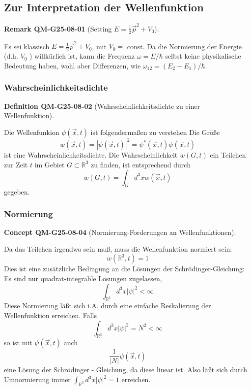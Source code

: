 \documentclass[10pt, letterpaper]{article}
\newcommand{\CustomHeading}[3]{%
  \par\medskip\noindent%
  \textbf{#1 #2} \textnormal{(#3)}.\enskip%
}
\newenvironment{DEF}[2]{\begin{unitbox}\CustomHeading{Definition}{#1}{#2}}{\end{unitbox}}
\newenvironment{REM}[2]{\begin{unitbox}\CustomHeading{Remark}{#1}{#2}}{\end{unitbox}}
\newenvironment{CONC}[2]{\begin{unitbox}\CustomHeading{Concept}{#1}{#2}}{\end{unitbox}}
\begin{document}
\pagebreak



\subsection{Zur Interpretation der Wellenfunktion}



\begin{REM}{QM-G25-08-01}{Setting $E=\frac{1}{2} \vec{p}^{2}+V_{0}$}
Es sei klassisch $E=\frac{1}{2} \vec{p}^{2}+V_{0}$, mit $V_{0}=$ const. Da die Normierung der Energie (d.h. $V_{0}$ ) willkürlich ist, kann die Frequenz $\omega=E / \hbar$ selbst keine physikalische Bedeutung haben, wohl aber Differenzen, wie $\omega_{12}=\left(E_{2}-E_{1}\right) / \hbar$.
\end{REM}


\subsubsection*{Wahrscheinlichkeitsdichte}


\begin{DEF}{QM-G25-08-02}{Wahrscheinlichkeitsdichte zu einer Wellenfunktion}
Die Wellenfunkion $\psi(\vec{x}, t)$ ist folgendermaßen zu verstehen
Die Größe
$$
w(\vec{x}, t)=|\psi(\vec{x}, t)|^{2}=\psi^{*}(\vec{x}, t) \psi(\vec{x}, t)
$$
ist eine Wahrscheinlichkeitsdichte. Die Wahrscheinlichkeit $w(G, t)$ ein Teilchen zur Zeit $t$ im Gebiet $G \subset \mathbb{R}^{3}$ zu finden, ist entsprechend durch
$$
w(G, t)=\int_{G} d^{3} x w(\vec{x}, t)
$$
gegeben.
\end{DEF}

\subsubsection*{Normierung}


\begin{CONC}{QM-G25-08-04}{Normierung-Forderungen an Wellenfunktionen}
Da das Teilchen irgendwo sein muß, muss die Wellenfunktion normiert sein:
$$
w\left(\mathbb{R}^{3}, t\right)=1
$$
Dies ist eine zusätzliche Bedingung an die Lösungen der Schrödinger-Gleichung: Es sind nur quadrat-integrable Lösungen zugelassen,
$$
\int_{\mathbb{R}^{3}} d^{3} x|\psi|^{2}<\infty
$$
Diese Normierung läßt sich i.A. durch eine einfache Reskalierung der Wellenfunktion erreichen. Falls
$$
\int_{\mathbb{R}^{3}} d^{3} x|\psi|^{2}=N^{2}<\infty
$$
so ist mit $\psi(\vec{x}, t)$ auch
$$
\frac{1}{|N|} \psi(\vec{x}, t)
$$
eine Lösung der Schrödinger - Gleichung, da diese linear ist. Also läßt sich durch Umnormierung immer $\int_{\mathbb{R}^{3}} d^{3} x|\psi|^{2}=1$ erreichen.
\end{CONC}
\end{document}
